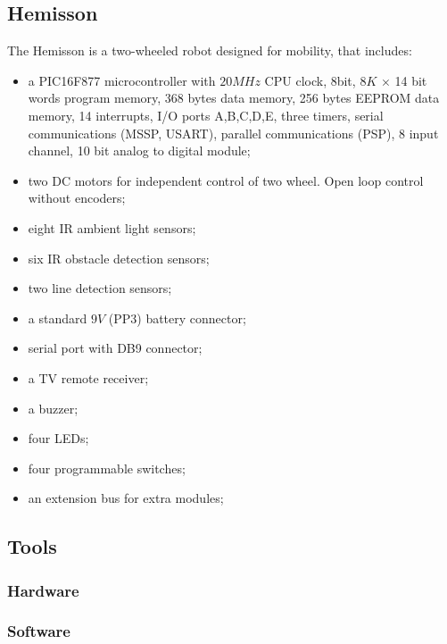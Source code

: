 \documentclass[a4paper,10pt]{article} %
\begin{document}

\subsection{Hemisson} %
\label{sub:Hemisson}

The Hemisson is a two-wheeled robot designed for mobility, that includes:
\begin{itemize}
    \item a PIC16F877 microcontroller with $20MHz$ CPU clock, 8bit,
    $8K$ $\times$ 14 bit words program memory, 368 bytes data memory, 256 bytes
    EEPROM data memory, 14 interrupts, I/O ports A,B,C,D,E, three timers,
    serial communications (MSSP, USART), parallel communications (PSP), 8
    input channel, 10 bit analog to digital module;
    \item two DC motors for independent control of two wheel. Open loop
    control without encoders;
    \item eight IR ambient light sensors;
    \item six IR obstacle detection sensors;
    \item two line detection sensors;
    \item a standard $9V$ (PP3) battery connector;
    \item serial port with DB9 connector;
    \item a TV remote receiver;
    \item a buzzer;
    \item four LEDs;
    \item four programmable switches;
    \item an extension bus for extra modules;
\end{itemize}


\subsection{Tools} %


\subsubsection{Hardware} %


\subsubsection{Software} %






\end{document}
